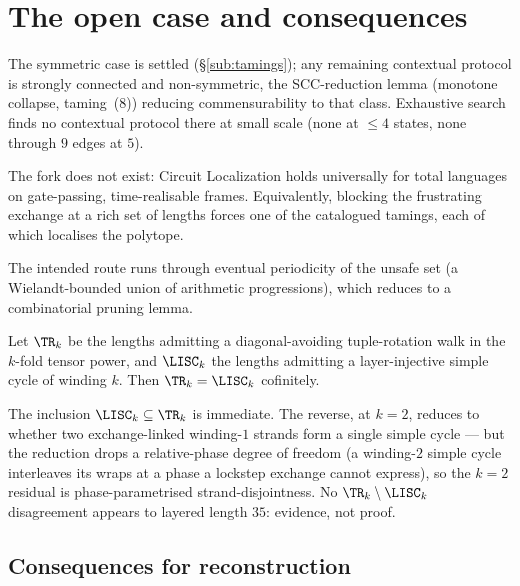 \section{The open case and consequences}\label{sec:open}

The symmetric case is settled (\S\ref{sub:tamings}); any remaining contextual
protocol is strongly connected and non-symmetric, the SCC-reduction lemma
(monotone collapse, taming~(8)) reducing commensurability to that class. Exhaustive search finds no contextual
protocol there at small scale (none at $\le4$ states, none through $9$ edges at
$5$).

\begin{conjecture}\label{conj:universal}
The fork does not exist: Circuit Localization holds universally for total
languages on gate-passing, time-realisable frames. Equivalently, blocking the
frustrating exchange at a rich set of lengths forces one of the catalogued
tamings, each of which localises the polytope.
\end{conjecture}

The intended route runs through eventual periodicity of the unsafe set (a
Wielandt-bounded union of arithmetic progressions), which reduces to a
combinatorial pruning lemma.

\begin{conjecture}\label{conj:pruning}
Let $\TR_k$ be the lengths admitting a diagonal-avoiding tuple-rotation walk in
the $k$-fold tensor power, and $\LISC_k$ the lengths admitting a layer-injective
simple cycle of winding $k$. Then $\TR_k=\LISC_k$ cofinitely.
\end{conjecture}

The inclusion $\LISC_k\subseteq\TR_k$ is immediate. The reverse, at $k=2$, reduces
to whether two exchange-linked winding-$1$ strands form a single simple cycle ---
but the reduction drops a relative-phase degree of freedom (a winding-$2$ simple
cycle interleaves its wraps at a phase a lockstep exchange cannot express), so the
$k=2$ residual is phase-parametrised strand-disjointness. No $\TR_k\setminus\LISC_k$
disagreement appears to layered length $35$: evidence, not proof.


\subsection{Consequences for reconstruction}\label{sub:consequences}

